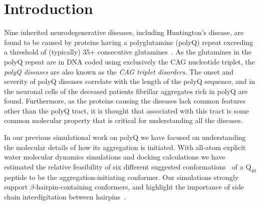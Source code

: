 \documentclass[a4paper,11pt,floatfix,authordate1-4,twocolumn]{revtex4-1}
\begin{document}
\maketitle

\thispagestyle{empty}

\section{Introduction}
Nine inherited neurodegenerative diseases, including Huntington's disease,
are found to be caused by proteins having a polyglutamine (polyQ) repeat
exceeding a threshold of (typically) 35+ consecutive glutamines~\cite{Williams:2008a,Hands:2010a}.
%
As the glutamines in the polyQ repeat are in DNA coded using exclusively the CAG nucleotide triplet,
the {\it polyQ diseases} are also known as the {\it CAG triplet disorders}.
%
The onset and severity of polyQ diseases
correlate with the length of the polyQ sequence, and in the neuronal
cells of the deceased patients fibrillar aggregates rich in polyQ are found. 
%
Furthermore, as the proteins causing the diseases lack common
features other than the polyQ tract,
it is thought that associated with this tract is some
common molecular property that is critical for understanding all the diseases.

In our previous simulational work on polyQ we have focused on understanding the molecular
details of how its aggregation is initiated.
With all-atom explicit water molecular dynamics simulations and docking calculations
we have estimated the relative feasibility of
six different suggested
conformations~\cite{Perutz:1994a,Perutz:2002a,Sikorski:2005a,Zanuy:2006a,Fiumara:2010a,Kar:2011a}
of a $\mathrm{Q}_{40}$ peptide to be the aggregation-initiating conformer.
Our simulations strongly support $\beta$-hairpin-containing conformers,
and highlight the importance of side chain interdigitation between
hairpins~\cite{Miettinen:2012a,Miettinen:2014a}.
\end{document}
